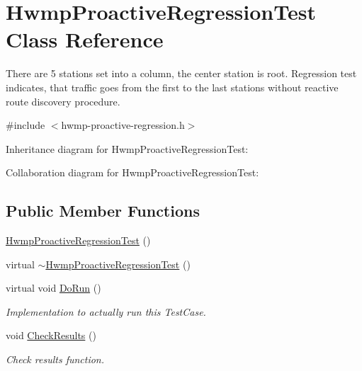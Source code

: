 \hypertarget{classHwmpProactiveRegressionTest}{}\section{Hwmp\+Proactive\+Regression\+Test Class Reference}
\label{classHwmpProactiveRegressionTest}


There are 5 stations set into a column, the center station is root. Regression test indicates, that traffic goes from the first to the last stations without reactive route discovery procedure.  




{\ttfamily \#include $<$hwmp-\/proactive-\/regression.\+h$>$}



Inheritance diagram for Hwmp\+Proactive\+Regression\+Test\+:


Collaboration diagram for Hwmp\+Proactive\+Regression\+Test\+:
\subsection*{Public Member Functions}
\begin{DoxyCompactItemize}
\item 
\hyperlink{classHwmpProactiveRegressionTest_a5887a375111c2375bd92cb49d9d6209a}{Hwmp\+Proactive\+Regression\+Test} ()
\item 
virtual \hyperlink{classHwmpProactiveRegressionTest_aa9bdbf81a87cddfd732cc2e8de000533}{$\sim$\+Hwmp\+Proactive\+Regression\+Test} ()
\item 
virtual void \hyperlink{classHwmpProactiveRegressionTest_ad000db534766301050336560b08b531e}{Do\+Run} ()
\begin{DoxyCompactList}\small\item\em Implementation to actually run this Test\+Case. \end{DoxyCompactList}\item 
void \hyperlink{classHwmpProactiveRegressionTest_aa67d222b93294ae6f4afb94e127a2cfb}{Check\+Results} ()
\begin{DoxyCompactList}\small\item\em Check results function. \end{DoxyCompactList}\end{DoxyCompactItemize}
